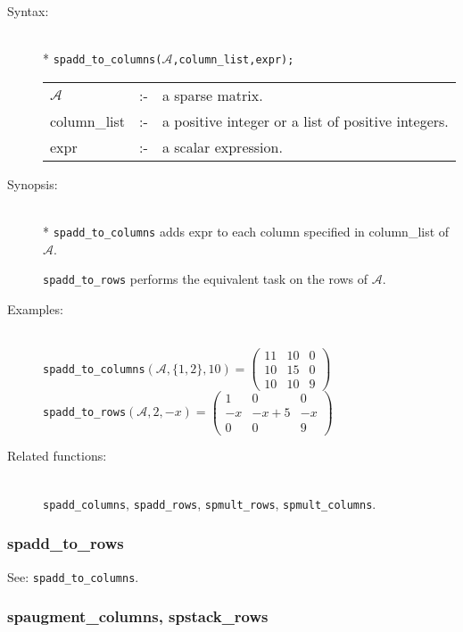 \begin{description}
  \item[Syntax:]\mbox{}\\*
\texttt{spadd\_to\_columns($\mathcal{A}$,column\_list,expr);}\\[2mm]
\begin{tabular}{l l l}
$\mathcal{A}$   &:-& a sparse matrix. \\
column\_list &:-& a positive integer or a list of positive integers. \\
expr        &:-& a scalar expression.
\end{tabular}

\item[Synopsis:]\mbox{}\\*
\texttt{spadd\_to\_columns} adds expr to each column specified in
column\_list of $\mathcal{A}$.

\texttt{spadd\_to\_rows} performs the equivalent task on the rows of
$\mathcal{A}$.

\item[Examples:]\mbox{}\\
\texttt{spadd\_to\_columns}\((\mathcal{A},\{1,2\},10)  =
\begin{pmatrix} 11 & 10 & 0 \\ 10 & 15 & 0 \\ 10 & 10 & 9 \end{pmatrix}\) \\[2mm]
\texttt{spadd\_to\_rows}\((\mathcal{A},2,-x)  =
\begin{pmatrix} 1 & 0 & 0 \\ -x & -x+5 & -x \\ 0 & 0 & 9 \end{pmatrix}\)

\item[Related functions:]\mbox{}\\
\texttt{spadd\_columns}, \texttt{spadd\_rows}, \texttt{spmult\_rows},
\texttt{spmult\_columns}.
\end{description}

\subsubsection{spadd\_to\_rows}
\label{sparse:spadd_to_rows}
\hypertarget{operator:SPADD_TO_ROWS}{}

See: \texttt{spadd\_to\_columns}.


\subsubsection{spaugment\_columns, spstack\_rows}
\label{sparse:spaugment_columns}
\hypertarget{operator:SPAUGMENT_COLUMNS}{}

